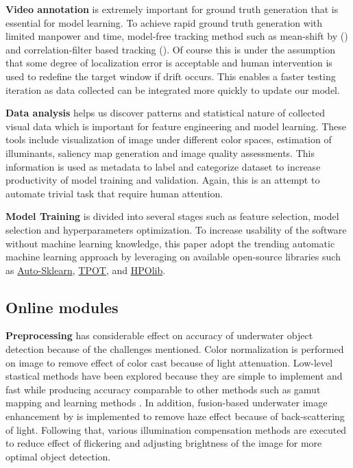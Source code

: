 \documentclass[fypca]{socreport}
\begin{document}
\textbf{Video annotation} is extremely important for ground truth
generation that is essential for model learning. To achieve rapid ground truth
generation with limited manpower and time, model-free tracking method such as
mean-shift by () and correlation-filter based tracking
(). Of course this is under the assumption that some
degree of localization error is acceptable and human intervention is used to
redefine the target window if drift occurs. This enables a faster testing
iteration as data collected can be integrated more quickly to update our model.

\textbf{Data analysis} helps us discover patterns and statistical nature of
collected visual data which is important for feature engineering and model
learning. These tools include visualization of image under different color
spaces, estimation of illuminants, saliency map generation and image quality
assessments. This information is used as metadata to label and categorize
dataset to increase productivity of model training and validation. Again, this
is an attempt to automate trivial task that require human attention.

\textbf{Model Training} is divided into several stages such as feature
selection, model selection and hyperparameters optimization. To increase
usability of the software without machine learning knowledge, this paper adopt the trending
automatic machine learning approach by leveraging on available open-source
libraries such as \href{https://github.com/automl/auto-sklearn}{Auto-Sklearn},
\href{https://github.com/rhiever/tpot}{TPOT}, and \href{https://github.com/automl/HPOlib}{HPOlib}.

\subsection{Online modules}

\textbf{Preprocessing} has considerable effect on accuracy of underwater object
detection because of the challenges mentioned. Color normalization is performed
on image to remove effect of color cast because of light attenuation. Low-level
stastical methods have been explored because they are simple to implement and
fast while producing accuracy comparable to other methods such as gamut mapping
and learning methods . In addition, fusion-based
underwater image enhancement by  is implemented to
remove haze effect because of back-scattering of light. Following that, various
illumination compensation methods are executed to reduce effect of flickering and
adjusting brightness of the image for more optimal object detection.
\end{document}
